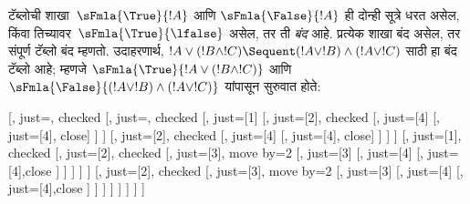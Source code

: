 \documentclass[../../../include/open-logic-section]{subfiles}
\begin{document}
टॅब्लोची शाखा~$\sFmla{\True}{!A}$ आणि
$\sFmla{\False}{!A}$ ही दोन्ही सूत्रे धरत असेल,
किंवा तिच्यावर~$\sFmla{\True}{\lfalse}$ असेल,
तर ती \emph{बंद} आहे. प्रत्येक शाखा बंद असेल,
तर संपूर्ण टॅब्लो बंद म्हणतो. उदाहरणार्थ,
$!A \lor (!B \land !C) \Sequent (!A \lor !B) \land
(!A \lor !C)$ साठी हा बंद टॅब्लो आहे; म्हणजे
$\sFmla{\True}{!A \lor (!B \land !C)}$ आणि
$\sFmla{\False}{(!A \lor !B) \land (!A \lor !C)}$
यांपासून सुरुवात होते:
\begin{maxwidth}
  \begin{tableau}{}
  [,
    just=\TAss, checked
    [, just=\TAss, checked
      [, just={\TRule{\True}{\lor}[1]}
        [,
          just={\TRule{\False}{\land}[2]}, checked
          [,
            just={\TRule{\False}{\lor}[4]}
            [,
              just={\TRule{\False}{\lor}[4]}, close]
          ]
        ]
        [,
          just={\TRule{\False}{\land}[2]}, checked
          [,
            just={\TRule{\False}{\lor}[4]}
            [,
              just={\TRule{\False}{\lor}[4]}, close]
          ]
        ]
      ]
      [,
        just={\TRule{\True}{\lor}[1]}, checked
        [,
          just={\TRule{\False}{\land}[2]}, checked
          [,
            just={\TRule{\True}{\land}[3]}, move by=2
            [,
              just={\TRule{\True}{\land}[3]}
              [,
                just={\TRule{\False}{\lor}[4]}
                [,
                  just={\TRule{\False}{\lor}[4]},close
                ]
              ]
            ]
          ]
        ]
        [,
          just={\TRule{\False}{\land}[2]}, checked
          [,
            just={\TRule{\True}{\land}[3]}, move by=2
              [,
                just={\TRule{\True}{\land}[3]}
                [,
                  just={\TRule{\False}{\lor}[4]}
                  [,
                  just={\TRule{\False}{\lor}[4]},close
                ]
              ]
            ]
          ]
        ]
      ]
    ]
  ]
\end{tableau}
\end{maxwidth}
\end{document}
